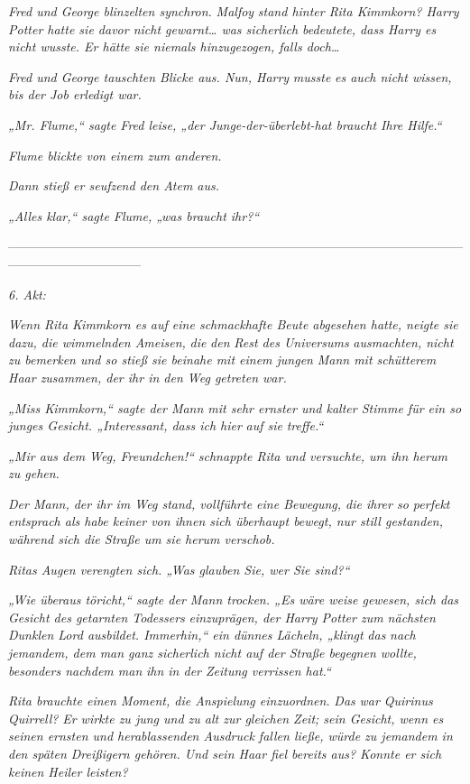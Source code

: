 {\emph{Fred und George blinzelten synchron.} \emph{\emph{Malfoy}} \emph{stand hinter Rita Kimmkorn? Harry Potter hatte sie davor nicht gewarnt… was sicherlich bedeutete, dass Harry es nicht wusste. Er hätte sie niemals hinzugezogen, falls doch…}

\emph{Fred und George tauschten Blicke aus. Nun, Harry} \emph{\emph{musste}} \emph{es auch nicht wissen, bis der Job erledigt war.}

\emph{„Mr. Flume,“ sagte Fred leise, „der Junge-der-überlebt-hat braucht Ihre Hilfe.“}

\emph{Flume blickte von einem zum anderen.}

\emph{Dann stieß er seufzend den Atem aus.}

\emph{„Alles klar,“ sagte Flume, „was braucht ihr?“}

--------------------------------------------------------------------------------------------------------------------------------------------

\emph{6. Akt:}

\emph{Wenn Rita Kimmkorn es auf eine schmackhafte Beute abgesehen hatte, neigte sie dazu, die wimmelnden Ameisen,} \emph{die} \emph{den} \emph{Rest des Universums} \emph{ausmachten, nicht zu bemerken und so stieß sie beinahe mit einem jungen} \emph{Mann mit schütterem Haar zusammen, der ihr in den Weg getreten war.}

\emph{„Miss Kimmkorn,“ sagte der Mann mit sehr ernster und kalter Stimme für ein so junges Gesicht. „Interessant, dass ich hier} \emph{auf sie} \emph{treffe.“}

\emph{„Mir aus dem Weg, Freundchen!“ schnappte Rita und versuchte, um ihn herum zu gehen.}

\emph{Der Mann, der ihr im Weg stand, vollführte eine Bewegung, die ihrer so perfekt entsprach als habe keiner von ihnen sich überhaupt bewegt, nur still gestanden, während sich die Straße um sie herum verschob.}

\emph{Ritas Augen verengten sich. „Was glauben Sie, wer Sie sind?“}

\emph{„Wie überaus töricht,“ sagte der Mann trocken. „Es wäre weise gewesen, sich das Gesicht des getarnten Todessers} \emph{einzuprägen, der Harry Potter zum nächsten Dunklen Lord ausbildet. Immerhin,“ ein dünnes Lächeln, „klingt} \emph{\emph{das}} \emph{nach jemandem, dem man ganz sicherlich nicht auf der Straße begegnen wollte, besonders nachdem man} \emph{ihn in der Zeitung verrissen hat.“}

\emph{Rita brauchte einen Moment, die Anspielung einzuordnen.} \emph{\emph{Das}} \emph{war Quirinus Quirrell?} \emph{Er wirkte zu jung und zu alt zur gleichen Zeit; sein Gesicht, wenn es seinen ernsten und herablassenden Ausdruck fallen ließe, würde zu jemandem in den späten Dreißigern gehören. Und sein Haar fiel bereits aus? Konnte er sich keinen Heiler leisten?}

}
